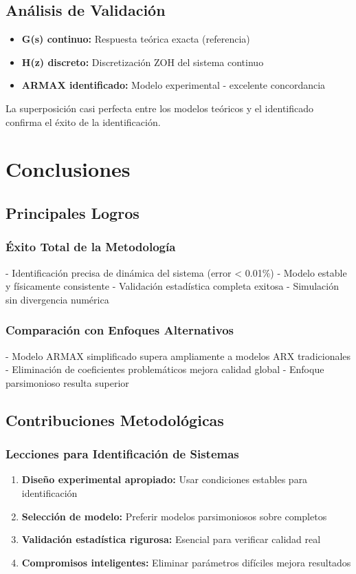 \documentclass[a4paper,openright,9pt]{report}
\begin{document}
\subsection{Análisis de Validación}

\begin{itemize}
\item \textbf{G(s) continuo:} Respuesta teórica exacta (referencia)
\item \textbf{H(z) discreto:} Discretización ZOH del sistema continuo
\item \textbf{ARMAX identificado:} Modelo experimental - excelente concordancia
\end{itemize}

La superposición casi perfecta entre los modelos teóricos y el identificado confirma el éxito de la identificación.

\section{Conclusiones}

\subsection{Principales Logros}

\subsubsection{Éxito Total de la Metodología}
- Identificación precisa de dinámica del sistema (error < 0.01\%)
- Modelo estable y físicamente consistente
- Validación estadística completa exitosa
- Simulación sin divergencia numérica

\subsubsection{Comparación con Enfoques Alternativos}
- Modelo ARMAX simplificado supera ampliamente a modelos ARX tradicionales
- Eliminación de coeficientes problemáticos mejora calidad global
- Enfoque parsimonioso resulta superior

\subsection{Contribuciones Metodológicas}

\subsubsection{Lecciones para Identificación de Sistemas}
\begin{enumerate}
\item \textbf{Diseño experimental apropiado:} Usar condiciones estables para identificación
\item \textbf{Selección de modelo:} Preferir modelos parsimoniosos sobre completos
\item \textbf{Validación estadística rigurosa:} Esencial para verificar calidad real
\item \textbf{Compromisos inteligentes:} Eliminar parámetros difíciles mejora resultados
\end{enumerate}
\end{document}
